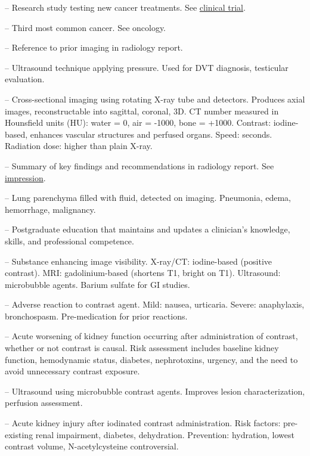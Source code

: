 -- Research study testing new cancer treatments. See \hyperlink{Clinical Trial}{clinical trial}.

-- Third most common cancer. See oncology.

-- Reference to prior imaging in radiology report.

-- Ultrasound technique applying pressure. Used for DVT diagnosis, testicular evaluation.


-- Cross-sectional imaging using rotating X-ray tube and detectors. Produces axial images, reconstructable into sagittal, coronal, 3D. CT number measured in Hounsfield units (HU): water = 0, air = -1000, bone = +1000. Contrast: iodine-based, enhances vascular structures and perfused organs. Speed: seconds. Radiation dose: higher than plain X-ray.


-- Summary of key findings and recommendations in radiology report. See \hyperlink{Impression}{impression}.

-- Lung parenchyma filled with fluid, detected on imaging. Pneumonia, edema, hemorrhage, malignancy.

-- Postgraduate education that maintains and updates a clinician's knowledge, skills, and professional competence.

-- Substance enhancing image visibility. X-ray/CT: iodine-based (positive contrast). MRI: gadolinium-based (shortens T1, bright on T1). Ultrasound: microbubble agents. Barium sulfate for GI studies.

-- Adverse reaction to contrast agent. Mild: nausea, urticaria. Severe: anaphylaxis, bronchospasm. Pre-medication for prior reactions.

-- Acute worsening of kidney function occurring after administration of contrast, whether or not contrast is causal. Risk assessment includes baseline kidney function, hemodynamic status, diabetes, nephrotoxins, urgency, and the need to avoid unnecessary contrast exposure.

-- Ultrasound using microbubble contrast agents. Improves lesion characterization, perfusion assessment.

-- Acute kidney injury after iodinated contrast administration. Risk factors: pre-existing renal impairment, diabetes, dehydration. Prevention: hydration, lowest contrast volume, N-acetylcysteine controversial.

